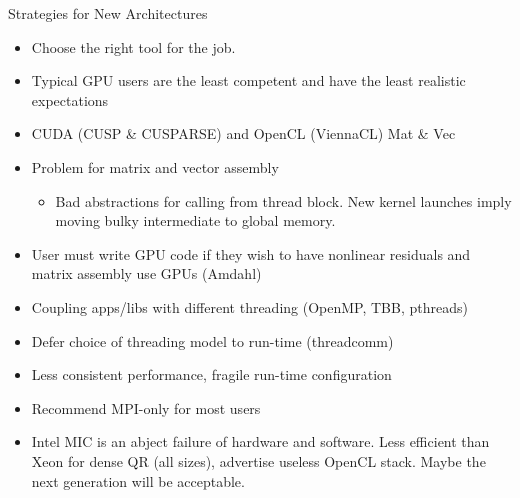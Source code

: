 \documentclass{beamer}
\begin{document}
\begin{frame}[shrink=5]{Strategies for New Architectures}
  \begin{itemize}
  \item Choose the right tool for the job.
  \item Typical GPU users are the least competent and have the least realistic expectations
  \item CUDA (CUSP \& CUSPARSE) and OpenCL (ViennaCL) Mat \& Vec
  \item Problem for matrix and vector assembly
    \begin{itemize}
    \item Bad abstractions for calling from thread block.  New kernel
      launches imply moving bulky intermediate to global memory.
    \end{itemize}
  \item User must write GPU code if they wish to have nonlinear
    residuals and matrix assembly use GPUs (Amdahl)
  \item Coupling apps/libs with different threading (OpenMP, TBB, pthreads)
  \item Defer choice of threading model to run-time (threadcomm)
  \item Less consistent performance, fragile run-time configuration
  \item Recommend MPI-only for most users
  \item Intel MIC is an abject failure of hardware and software.  Less
    efficient than Xeon for dense QR (all sizes), advertise useless
    OpenCL stack.  Maybe the next generation will be acceptable.
  \end{itemize}
\end{frame}
\end{document}
